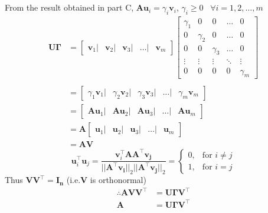 \documentclass{article}
\begin{document}
\section{}
From the result obtained in part C,
$\bm{A}\bm{u}_i = \gamma_i \bm{v}_i $, $\gamma_i \geq 0 \hspace{10pt}\forall i=1,2,\dots,m$
\begin{align*}
    \bm{U}\bm{\Gamma} &= 
        \begin{bmatrix}
        \bm{v}_1| & \bm{v}_2|& \bm{v}_3|& \dots |& \bm{v}_m
        \end{bmatrix}
        \begin{bmatrix}
    \gamma_1 & 0 & 0 & \dots & 0\\
    0 & \gamma_2 & 0 & \dots & 0\\
    0 & 0 & \gamma_3 & \dots  & 0\\
    \vdots & \vdots & \vdots & \ddots & \vdots\\
    0 & 0 & 0 & 0 & \gamma_m
\end{bmatrix}\\\\
&= \begin{bmatrix}
        \gamma_1\bm{v}_1| & \gamma_2\bm{v}_2|& \gamma_3\bm{v}_3|& \dots |& \gamma_m\bm{v}_m
        \end{bmatrix}\\
&= \begin{bmatrix}
        \bm{Au}_1| & \bm{Au}_2|& \bm{Au}_3|& \dots |& \bm{Au}_m
        \end{bmatrix}\\
&= \bm{A}\begin{bmatrix}
        \bm{u}_1| & \bm{u}_2|& \bm{u}_3|& \dots |& \bm{u}_m
        \end{bmatrix}\\  
&=\bm{AV}
\end{align*}
\[\bm{u}_i^\intercal\bm{u}_j =\frac{\bm{v}_i^\intercal\bm{A}\bm{A}^\intercal \bm{v_j}}{\lvert\lvert\bm{A}^\intercal \bm{v_i} \rvert\rvert_2 \lvert\lvert\bm{A}^\intercal \bm{v_j} \rvert\rvert_2} = 
\begin{cases}
0, & \text{for } i\neq j\\
1, & \text{for } i=j
\end{cases}
\]
\vspace{5pt}
Thus $\bm{V}\bm{V}^\intercal = \bm{I_n}$ (i.e.$\bm{V}$ is orthonormal)
\begin{align*}
    \therefore \bm{A}\bm{V}\bm{V}^\intercal &= \bm{U\Gamma}\bm{V}^\intercal\\
    \bm{A}&= \bm{U\Gamma}\bm{V}^\intercal
\end{align*}
\end{document}

